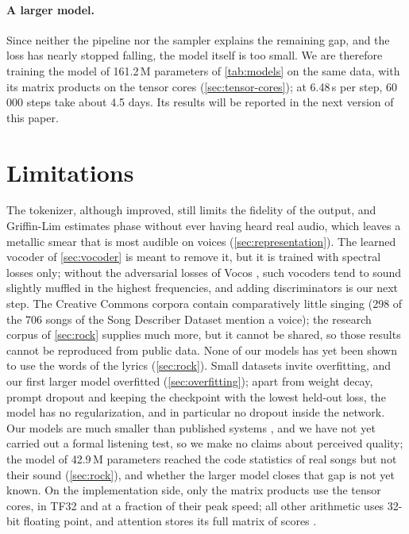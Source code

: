 \paragraph{A larger model.} Since neither the pipeline nor the sampler
explains the remaining gap, and the loss has nearly stopped falling, the
model itself is too small. We are therefore training the model of 161.2\,M
parameters of \cref{tab:models} on the same data, with its matrix products on
the tensor cores (\cref{sec:tensor-cores}); at 6.48\,s per step, 60\,000 steps
take about 4.5 days. Its results will be reported in the next version of this
paper.

\section{Limitations}
\label{sec:limitations}

The tokenizer, although improved, still limits the fidelity of the output,
and Griffin-Lim estimates phase without ever having heard real audio, which
leaves a metallic smear that is most audible on voices (\cref{sec:representation}).
The learned vocoder of \cref{sec:vocoder} is meant to remove it, but it is
trained with spectral losses only; without the adversarial losses of Vocos
\cite{siuzdak2023vocos}, such vocoders tend to sound slightly muffled in the
highest frequencies, and adding discriminators is our next step. The
Creative Commons corpora contain comparatively little singing (298 of the 706
songs of the Song Describer Dataset mention a voice); the research corpus of
\cref{sec:rock} supplies much more, but it cannot be shared, so those results
cannot be reproduced from public data. None of our models has yet been shown
to use the words of the lyrics (\cref{sec:rock}).
Small datasets invite overfitting, and our first larger model overfitted
(\cref{sec:overfitting}); apart from weight decay, prompt dropout and keeping
the checkpoint with the lowest held-out loss, the model has no regularization,
and in particular no dropout inside the network.
Our models are much smaller than published systems \cite{copet2023musicgen},
and we have not yet carried out a formal listening test, so we make no claims
about perceived quality; the model of 42.9\,M parameters reached the code
statistics of real songs but not their sound (\cref{sec:rock}), and whether
the larger model closes that gap is not yet known. On the implementation side,
only the matrix products use the tensor cores, in TF32 and at a fraction of
their peak speed; all other arithmetic uses 32-bit floating point, and
attention stores its full matrix of scores \cite{dao2022flashattention}.

